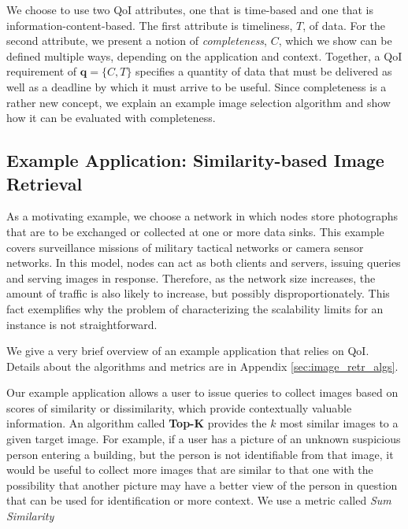 We choose to use two QoI attributes, one that is time-based and one that is information-content-based.  The first attribute is timeliness, $T$, of data.  For the second attribute, we present a notion of \emph{completeness}, $C$, which we show can be defined multiple ways, depending on the application and context.  Together, a QoI requirement of $\mathbf{q} = \{C,T\}$ specifies a quantity of data that must be delivered as well as a deadline by which it must arrive to be useful.  Since completeness is a rather new concept, we explain an example image selection algorithm and show how it can be evaluated with completeness.

\subsection{Example Application: Similarity-based Image Retrieval}

As a motivating example, we choose a network in which nodes store photographs that are to be exchanged or collected at one or more data sinks.  This example covers surveillance missions of military tactical networks or camera sensor networks.  In this model, nodes can act as both clients and servers, issuing queries and serving images in response.  Therefore, as the network size increases, the amount of traffic is also likely to increase, but possibly disproportionately.  This fact exemplifies why the problem of characterizing the scalability limits for an instance is not straightforward.

We give a very brief overview of an example application that relies on QoI. Details about the algorithms and metrics are in Appendix \ref{sec:image_retr_algs}.

Our example application allows a user to issue queries to collect images based on scores of similarity or dissimilarity, which provide contextually valuable information. An algorithm called {\bf Top-K} provides the $k$ most similar images to a given target image. For example, if a user has a picture of an unknown suspicious person entering a building, but the person is not identifiable from that image, it would be useful to collect more images that are similar to that one with the possibility that another picture may have a better view of the person in question that can be used for identification or more context. We use a metric called \emph{Sum Similarity}

